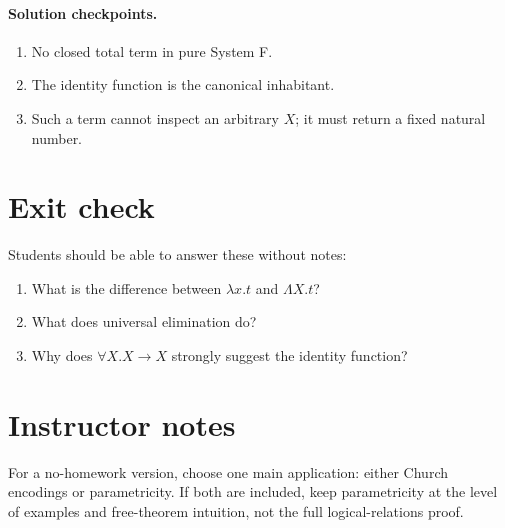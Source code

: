\documentclass[11pt]{article}
\begin{document}
\paragraph{Solution checkpoints.}
\begin{enumerate}[nosep]
  \item No closed total term in pure System F.
  \item The identity function is the canonical inhabitant.
  \item Such a term cannot inspect an arbitrary $X$; it must return a fixed natural number.
\end{enumerate}

\section*{Exit check}
Students should be able to answer these without notes:
\begin{enumerate}[nosep]
  \item What is the difference between $\lambda x.t$ and $\Lambda X.t$?
  \item What does universal elimination do?
  \item Why does $\forall X. X \to X$ strongly suggest the identity function?
\end{enumerate}

\section*{Instructor notes}
For a no-homework version, choose one main application: either Church encodings or parametricity. If both are included, keep parametricity at the level of examples and free-theorem intuition, not the full logical-relations proof.
\end{document}
